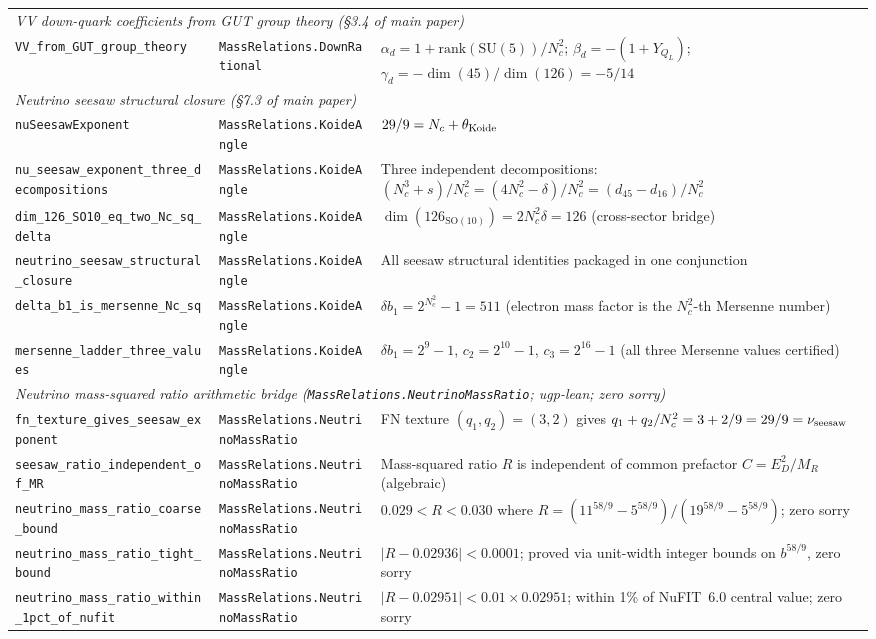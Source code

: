 \documentclass[10pt]{article}
\begin{document}
\begin{longtable}{@{} p{3.8cm} p{4.8cm} p{4.8cm} @{}}
\multicolumn{3}{l}{\textit{VV down-quark coefficients from GUT group theory (\S3.4 of main paper)}} \\[2pt]
\nolinkurl{VV_from_GUT_group_theory} & \nolinkurl{MassRelations.DownRational} & $\alpha_d = 1 + \mathrm{rank}(\mathrm{SU}(5))/N_c^2$; $\beta_d = -(1+Y_{Q_L})$; $\gamma_d = -\dim(45)/\dim(126) = -5/14$ \\[4pt]

\multicolumn{3}{l}{\textit{Neutrino seesaw structural closure (\S7.3 of main paper)}} \\[2pt]
\nolinkurl{nuSeesawExponent} & \nolinkurl{MassRelations.KoideAngle} & $29/9 = N_c + \theta_{\rm Koide}$ \\
\texttt{nu\_seesaw\_exponent\_\allowbreak{}three\_decompositions} & \nolinkurl{MassRelations.KoideAngle} & Three independent decompositions: $(N_c^3+s)/N_c^2 = (4N_c^2-\delta)/N_c^2 = (d_{45}-d_{16})/N_c^2$ \\
\nolinkurl{dim_126_SO10_eq_two_Nc_sq_delta} & \nolinkurl{MassRelations.KoideAngle} & $\dim(126_{\mathrm{SO}(10)}) = 2N_c^2\delta = 126$ (cross-sector bridge) \\
\nolinkurl{neutrino_seesaw_structural_closure} & \nolinkurl{MassRelations.KoideAngle} & All seesaw structural identities packaged in one conjunction \\
\nolinkurl{delta\_b1\_is\_mersenne\_Nc\_sq} & \nolinkurl{MassRelations.KoideAngle} & $\delta b_1 = 2^{N_c^2}-1 = 511$ (electron mass factor is the $N_c^2$-th Mersenne number) \\
\nolinkurl{mersenne\_ladder\_three\_values} & \nolinkurl{MassRelations.KoideAngle} & $\delta b_1 = 2^9-1$, $c_2 = 2^{10}-1$, $c_3 = 2^{16}-1$ (all three Mersenne values certified) \\[4pt]

\multicolumn{3}{l}{\textit{Neutrino mass-squared ratio arithmetic bridge (\texttt{MassRelations.NeutrinoMassRatio}; ugp-lean; zero sorry)}} \\[2pt]
\nolinkurl{fn_texture_gives_seesaw_exponent} & \nolinkurl{MassRelations.NeutrinoMassRatio} & FN texture $(q_1,q_2) = (3,2)$ gives $q_1 + q_2/N_c^2 = 3 + 2/9 = 29/9 = \nu_{\rm seesaw}$ \\
\nolinkurl{seesaw_ratio_independent_of_MR} & \nolinkurl{MassRelations.NeutrinoMassRatio} & Mass-squared ratio $R$ is independent of common prefactor $C = E_D^2/M_R$ (algebraic) \\
\nolinkurl{neutrino_mass_ratio_coarse_bound} & \nolinkurl{MassRelations.NeutrinoMassRatio} & $0.029 < R < 0.030$ where $R = (11^{58/9} - 5^{58/9})/(19^{58/9} - 5^{58/9})$; zero sorry \\
\nolinkurl{neutrino_mass_ratio_tight_bound} & \nolinkurl{MassRelations.NeutrinoMassRatio} & $|R - 0.02936| < 0.0001$; proved via unit-width integer bounds on $b^{58/9}$, zero sorry \\
\nolinkurl{neutrino_mass_ratio_within_1pct_of_nufit} & \nolinkurl{MassRelations.NeutrinoMassRatio} & $|R - 0.02951| < 0.01 \times 0.02951$; within 1\% of NuFIT~6.0 central value; zero sorry \\[4pt]


\end{longtable}
\end{document}
